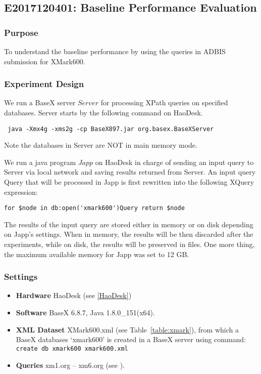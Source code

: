 \subsection{E2017120401: Baseline Performance Evaluation}
 
\subsubsection{Purpose}
To understand the baseline performance by using
the queries in ADBIS submission for XMark600. 

\subsubsection{Experiment Design}  

We run a BaseX server $Server$ for processing XPath queries on specified 
databases. Server starts by the following command on HaoDesk.

\verb| java -Xmx4g -xms2g -cp BaseX897.jar org.basex.BaseXServer|

Note the databases in Server are NOT in main memory mode.

We run a java program $Japp$ on HaoDesk in charge of sending an input query to
Server via local network and saving results returned from Server. An input query Query that will be
processed in Japp is first rewritten into the following XQuery expression:

\verb|for $node in db:open('xmark600')Query return $node|

The results of the input query are stored either in memory or on disk depending on Japp's settings. When in memory, the results will be then discarded after the
experiments, while on disk, the results will be preserved in files. One more thing, the maximum available memory for Japp was set to 12 GB.

\subsubsection{Settings} 

\begin{itemize}
	
	\item \textbf{Hardware} HaoDesk (see \ref{HaoDesk})\\
	\item \textbf{Software} BaseX 6.8.7, Java 1.8.0\_151(x64).\\
	\item \textbf{XML Dataset} XMark600.xml (see Table~\ref{table:xmark}), 
	from which a BaseX databases `xmark600' is created in a BaseX server using command:\\
	\verb|create db xmark600 xmark600.xml|
	\item \textbf{Queries} xm1.org -- xm6.org (see ).
	
\end{itemize}


